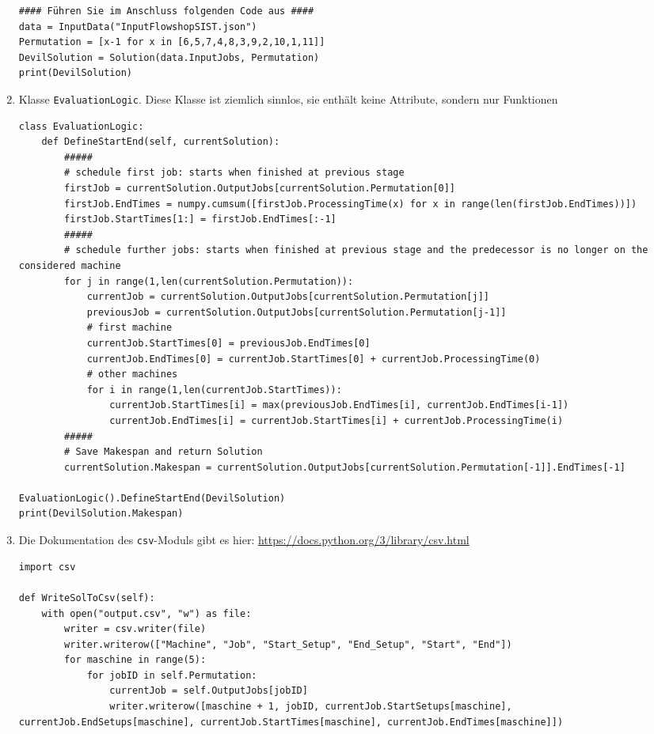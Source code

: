 \documentclass{article}
\begin{document}
\begin{enumerate}[label=(\alph*)]
\begin{lstlisting}
#### Führen Sie im Anschluss folgenden Code aus ####
data = InputData("InputFlowshopSIST.json")
Permutation = [x-1 for x in [6,5,7,4,8,3,9,2,10,1,11]]
DevilSolution = Solution(data.InputJobs, Permutation) 
print(DevilSolution)
		\end{lstlisting}
		\item Klasse \texttt{EvaluationLogic}. Diese Klasse ist ziemlich sinnlos, sie enthält keine Attribute, sondern nur Funktionen
		\begin{lstlisting}
class EvaluationLogic:    
	def DefineStartEnd(self, currentSolution):    
		#####
		# schedule first job: starts when finished at previous stage
		firstJob = currentSolution.OutputJobs[currentSolution.Permutation[0]]
		firstJob.EndTimes = numpy.cumsum([firstJob.ProcessingTime(x) for x in range(len(firstJob.EndTimes))])
		firstJob.StartTimes[1:] = firstJob.EndTimes[:-1]
		#####
		# schedule further jobs: starts when finished at previous stage and the predecessor is no longer on the considered machine
		for j in range(1,len(currentSolution.Permutation)):
			currentJob = currentSolution.OutputJobs[currentSolution.Permutation[j]]
			previousJob = currentSolution.OutputJobs[currentSolution.Permutation[j-1]]
			# first machine
			currentJob.StartTimes[0] = previousJob.EndTimes[0]
			currentJob.EndTimes[0] = currentJob.StartTimes[0] + currentJob.ProcessingTime(0)
			# other machines
			for i in range(1,len(currentJob.StartTimes)):
				currentJob.StartTimes[i] = max(previousJob.EndTimes[i], currentJob.EndTimes[i-1])
				currentJob.EndTimes[i] = currentJob.StartTimes[i] + currentJob.ProcessingTime(i)
		#####
		# Save Makespan and return Solution
		currentSolution.Makespan = currentSolution.OutputJobs[currentSolution.Permutation[-1]].EndTimes[-1]

EvaluationLogic().DefineStartEnd(DevilSolution)
print(DevilSolution.Makespan)
		\end{lstlisting}
		\item Die Dokumentation des \texttt{csv}-Moduls gibt es hier: \url{https://docs.python.org/3/library/csv.html}
		\begin{lstlisting}
import csv

def WriteSolToCsv(self):
	with open("output.csv", "w") as file:
		writer = csv.writer(file)
		writer.writerow(["Machine", "Job", "Start_Setup", "End_Setup", "Start", "End"])
		for maschine in range(5):
			for jobID in self.Permutation:
				currentJob = self.OutputJobs[jobID]
				writer.writerow([maschine + 1, jobID, currentJob.StartSetups[maschine], currentJob.EndSetups[maschine], currentJob.StartTimes[maschine], currentJob.EndTimes[maschine]])


\end{lstlisting}
\end{enumerate}
\end{document}
